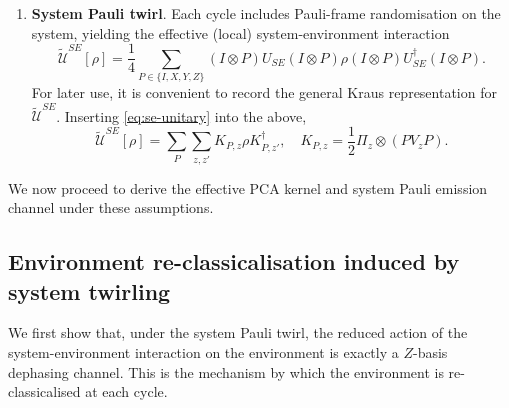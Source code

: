 \begin{enumerate}
    \item[(A5)]\label{A5} \textbf{System Pauli twirl}.
    Each cycle includes Pauli-frame randomisation on the system, yielding the effective (local) system-environment interaction
    \begin{equation}
        \widetilde{\mathcal{U}}^{SE}[\rho] = \frac{1}{4}\sum_{P\in\{I,X,Y,Z\}} (I \otimes P) U_{SE} (I \otimes P) \rho (I \otimes P) U_{SE}^\dagger (I \otimes P).
    \end{equation}
    For later use, it is convenient to record the general Kraus representation for \(\widetilde{\mathcal{U}}^{SE}\). Inserting \cref{eq:se-unitary} into the above,
    \begin{equation}\label{eq:twirled-kraus-ops}
    \widetilde{\mathcal{U}}^{SE}[\rho] = \sum_P \sum_{z,z'} K_{P, z} \rho K_{P, z'}^\dagger, \quad K_{P, z} = \frac{1}{2} \Pi_z \otimes (P V_z P).
\end{equation}
\end{enumerate}
We now proceed to derive the effective PCA kernel and system Pauli emission channel under these assumptions.

\subsection{Environment re-classicalisation induced by system twirling}\label{app:env-dephasing}
We first show that, under the system Pauli twirl, the reduced action of the system-environment interaction on the environment is exactly a \(Z\)-basis dephasing channel. This is the mechanism by which the environment is re-classicalised at each cycle.

